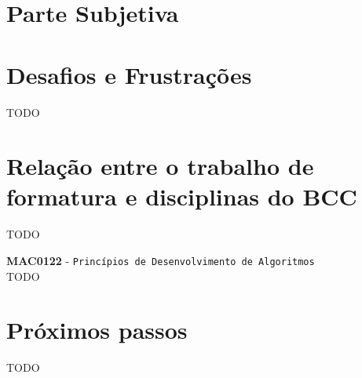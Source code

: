 \chapter*{Parte Subjetiva}
\label{sec:parte_subjetiva}

\chapter{Desafios e Frustrações}
\label{sec:desafios_frustracoes}

TODO

\chapter{Relação entre o trabalho de formatura e disciplinas do BCC}
\label{sec:relacao_disciplinas_bcc}

TODO

\newcommand\materia[3]{\noindent \textbf{#1} - \texttt{#2}\\\indent #3\vspace{0.5cm}\\}

\materia{MAC0122}{Princípios de Desenvolvimento de Algoritmos}{
    TODO
}

\chapter{Próximos passos}
\label{sec:proximos_passos}

TODO
